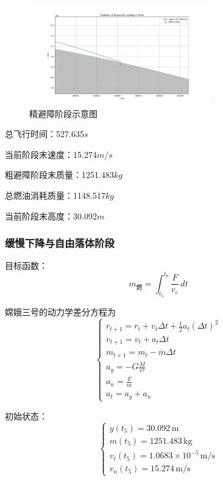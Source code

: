 \documentclass{ctexart}
\begin{document}
    \begin{figure}[H] %
        \centering %
        \includegraphics[width=0.7\textwidth]{"./picture/stage4.png"} %
        \caption{精避障阶段示意图} %
        \label{fig:example} %
    \end{figure}

总飞行时间：527.635\(s\)

当前阶段末速度：15.274\(m/s\)

粗避障阶段末质量：1251.483\(kg\)

总燃油消耗质量：1148.517\(kg\)

当前阶段末高度：30.092\(m\)
\subsubsection{缓慢下降与自由落体阶段}

目标函数：
\begin{equation}
m_{\text{燃}} = \int_{t_5}^{t_6} \frac{F}{v_e} \, dt
\end{equation}

嫦娥三号的动力学差分方程为
\[
\begin{cases}
r_{t+1} = r_t + v_t \Delta t + \frac{1}{2} a_t (\Delta t)^2 \\
v_{t+1} = v_t + a_t \Delta t \\
m_{t+1} = m_t - \dot{m} \Delta t \\
a_g = - G \frac{M}{r^2} \\
a_n = \frac{F}{m} \\
a_t = a_g + a_n
\end{cases}
\]

初始状态：
\begin{equation}
\begin{cases}
y(t_5) = 30.092 \, \text{m} \\
m(t_5) = 1251.483 \, \text{kg} \\
v_t(t_5) = 1.0683\times 10^{-5} \, \text{m/s} \\
v_n(t_5) = 15.274 \, \text{m/s}
\end{cases}
\end{equation}
\end{document}

